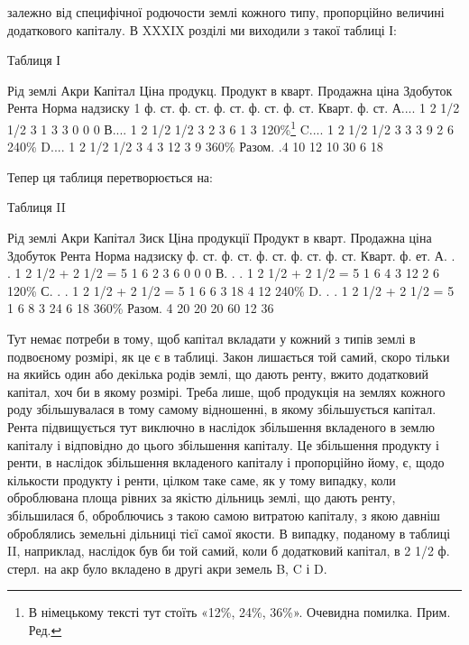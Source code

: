 залежно від специфічної родючости землі кожного типу, пропорційно величині
додаткового капіталу. В XXXIX розділі ми виходили з такої таблиці І:

Таблиця І

Рід землі    Акри Капітал    Ціна продукц. Продукт в кварт.
Продажна  ціна    Здобуток    Рента    Норма  надзиску
        1 ф. ст. ф. ст. ф. ст. ф. ст. ф. ст. Кварт. ф. ст.
А....    1    2 1/2    1/2    3    1    3    3    0    0    0
В....    1    2 1/2    1/2    3    2    3    6    1    3    120\%\footnote*{
В німецькому тексті тут стоїть «12\%, 24\%, 36\%». Очевидна помилка. Прим. Ред.
}
C....    1    2 1/2    1/2    3    3    3    9    2    6    240\%
D....    1    2 1/2    1/2    3    4    3    12    3    9    360\%
Разом. .4    10               12    10        30    6    18

Тепер ця таблиця перетворюється на:

Таблиця II

Рід  землі    Акри  Капітал    Зиск    Ціна продукції Продукт в кварт.
Продажна  ціна    Здобуток    Рента    Норма  надзиску
        ф. ст. ф. ст. ф. ст. ф. ст. ф. ст. Кварт. ф. ет.
А. . .    1    2 1/2 + 2 1/2 = 5    1    6    2    3    6    0    0    0
В. . .    1    2 1/2 + 2 1/2 = 5    1    6    4    3    12    2    6    120\%
С. . .    1    2 1/2 + 2 1/2 = 5    1    6    6    3    18    4    12    240\%
D. . .    1    2 1/2 + 2 1/2 = 5    1    6    8    3    24    6    18    360\%
Разом.    4          20            20        20            60    12    36

Тут немає потреби в тому, щоб капітал вкладати у кожний з типів землі
в подвоєному розмірі, як це є в таблиці. Закон лишається той самий, скоро
тільки на якийсь один або декілька родів землі, що дають ренту, вжито додатковий капітал, хоч би в
якому розмірі. Треба лише, щоб продукція на землях
кожного роду збільшувалася в тому самому відношенні, в якому збільшується
капітал. Рента підвищується тут виключно в наслідок збільшення вкладеного
в землю капіталу і відповідно до цього збільшення капіталу. Це збільшення
продукту і ренти, в наслідок збільшення вкладеного капіталу і пропорційно
йому, є,  щодо кількости продукту і ренти, цілком таке саме, як у тому випадку,
коли оброблювана площа рівних за якістю дільниць землі, що дають ренту,
збільшилася б, оброблючись з такою самою витратою капіталу, з якою давніш оброблялись земельні
дільниці тієї самої якости. В випадку, поданому в таблиці II, наприклад, наслідок був би той самий,
коли б додатковий капітал,
в 2 1/2 ф. стерл. на акр було вкладено в другі акри земель B, C і D.